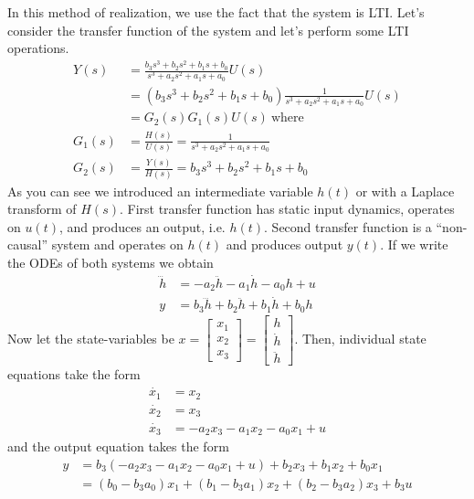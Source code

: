 \documentclass[twoside]{article}
\begin{document}
In this method of realization, we use the fact that the system is
LTI. Let's consider the transfer function of the system and let's 
perform some LTI operations.
%
\begin{align*}
Y(s) &= \frac{ b_3 s^3 + b_2 s^2  + b_1 s + b_0 }{ s^3 + a_2 s^2 + a_1 s + a_0} U(s)
\\
&= \left( b_3 s^3 + b_2 s^2  + b_1 s + b_0 \right)  
\frac{1}{ s^3 + a_2 s^2 + a_1 s + a_0 } U(s) 
\\
&= G_2(s) G_1(s) U(s) \ \mathrm{where} 
\\
G_1(s) &= \frac{H(s)}{U(s)} = \frac{1}{ s^3 + a_2 s^2 + a_1 s + a_0 } 
\\
G_2(s) &= \frac{Y(s)}{H(s)} = b_3 s^3 + b_2 s^2  + b_1 s + b_0
\end{align*}
%
As you can see we introduced an intermediate variable $h(t)$ or with a
Laplace transform of $H(s)$. First transfer function has static input
dynamics, operates on $u(t)$, and produces an output, i.e. $h(t)$. 
Second transfer function is a ``non-causal'' system and operates on $h(t)$ and produces output
$y(t)$. If we write the ODEs of both systems we obtain
%
\begin{align*}
\dddot{h} &= -a_2 \ddot{h} - a_1 \dot{h} - a_0 h + u
\\
y &= b_3 \dddot{h} + b_2 \ddot{h} + b_1 \dot{h} + b_0 h
\end{align*}
%
Now let the state-variables be 
$x = \left[ \begin{array}{c} x_1 \\ x_2 \\ x_3 \end{array} \right] 
= \left[ \begin{array}{c} h \\ \dot{h} \\ \ddot{h} \end{array} \right]$. Then,
individual state equations take the form
%
\begin{align*}
\dot{x_1} &= x_2
\\
\dot{x_2} &= x_3
\\
\dot{x_3} &= -a_2 x_3 - a_1 x_2 - a_0 x_1 + u
\end{align*}
%
and the output equation takes the form
%
\begin{align*}
y &= b_3\left( -a_2 x_3 - a_1 x_2 - a_0 x_1 + u \right) + b_2 x_3 +
    b_1 x_2 + b_0 x_1
\\
&= ( b_0 - b_3 a_0 ) x_1 + ( b_1 - b_3 a_1 ) x_2 + ( b_2 - b_3 a_2 ) x_3 + b_3 u
\end{align*}
\end{document}
